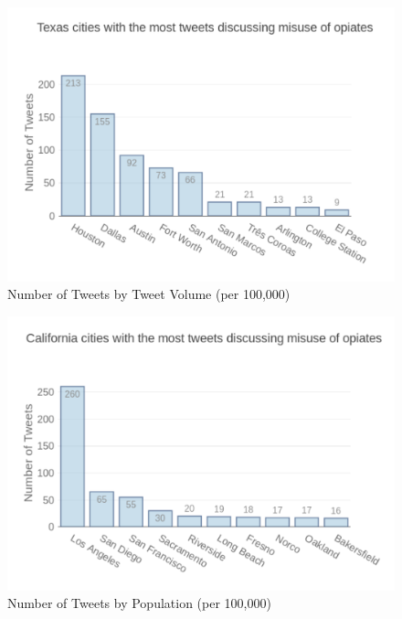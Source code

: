 \documentclass[sigconf]{acmart}
\begin{document}
\begin{figure}[!ht]
  \centering\includegraphics[width=\columnwidth]{images/Figure1.pdf}
  \caption{Number of Tweets by Tweet Volume (per 100,000)}
  \label{f:Figure1}
\end{figure}

\begin{figure}[!ht]
  \centering\includegraphics[width=\columnwidth]{images/Figure2.pdf}
  \caption{Number of Tweets by Population (per 100,000)}
  \label{f:Figure2}
\end{figure}
\end{document}
